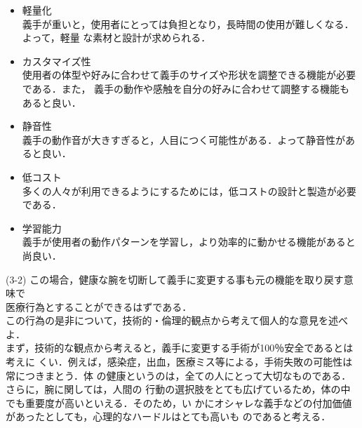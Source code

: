 \documentclass{jsarticle}
\begin{document}
\begin{itemize}
  \item  軽量化\\
  \hspace*{5.5zw}義手が重いと，使用者にとっては負担となり，長時間の使用が難しくなる．よって，軽量
  \hspace*{5.5zw}な素材と設計が求められる．\\

  \item カスタマイズ性\\
  \hspace*{5.5zw}使用者の体型や好みに合わせて義手のサイズや形状を調整できる機能が必要である．また，
  \hspace*{5.5zw}義手の動作や感触を自分の好みに合わせて調整する機能もあると良い．\\

  \item 静音性\\
  \hspace*{5.5zw}義手の動作音が大きすぎると，人目につく可能性がある．よって静音性があると良い．\\

  \item 低コスト\\
  \hspace*{5.5zw}多くの人々が利用できるようにするためには，低コストの設計と製造が必要である．\\

  \item  学習能力\\
  \hspace*{5.5zw}義手が使用者の動作パターンを学習し，より効率的に動かせる機能があると尚良い．\\


  


  
\end{itemize}

\hspace*{4.7zw}(3-2) この場合，健康な腕を切断して義手に変更する事も元の機能を取り戻す意味で\\
\hspace*{8.4zw}医療行為とすることができるはずである．\\
\hspace*{8.4zw}この行為の是非について，技術的・倫理的観点から考えて個人的な意見を述べよ．\\

\hspace*{8.4zw}まず，技術的な観点から考えると，義手に変更する手術が100％安全であるとは考えに
\hspace*{8.4zw}くい．例えば，感染症，出血，医療ミス等による，手術失敗の可能性は常につきまとう．体
\hspace*{8.4zw}の健康というのは，全ての人にとって大切なものである．さらに，腕に関しては，人間の
\hspace*{8.4zw}行動の選択肢をとても広げているため，体の中でも重要度が高いといえる．そのため，い
\hspace*{8.4zw}かにオシャレな義手などの付加価値があったとしても，心理的なハードルはとても高いも
\hspace*{8.4zw}のであると考える．
\end{document}

